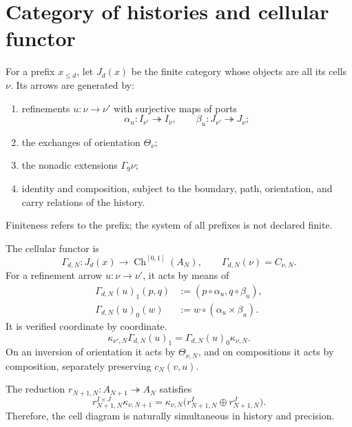 \section{Category of histories and cellular functor}
\label{sec:pdfv2-coh-category}

For a prefix \(x_{\leq d}\), let \(J_d(x)\) be the finite category whose
objects are all its cells \(\nu\). Its arrows are generated by:
\begin{enumerate}
 \item refinements \(u:\nu\to\nu'\) with surjective maps of
       ports
       \[
        \alpha_u:I_{\nu'}\twoheadrightarrow I_\nu,
        \qquad
        \beta_u:J_{\nu'}\twoheadrightarrow J_\nu;
       \]
 \item the exchanges of orientation \(\Theta_\nu\);
 \item the nonadic extensions \(\Gamma_9\nu\);
 \item identity and composition, subject to the boundary,
       path, orientation, and carry relations of the history.
\end{enumerate}
Finiteness refers to the prefix; the system of all prefixes is not declared finite.

The cellular functor is
\begin{equation}\label{eq:pdfv2-coh-gamma-functor}
 \Gamma_{d,N}:J_d(x)\longrightarrow
 \operatorname{Ch}^{[0,1]}(A_N),
 \qquad
 \Gamma_{d,N}(\nu)=C_{\nu,N}.
\end{equation}
For a refinement arrow \(u:\nu\to\nu'\), it acts by means of
\begin{align}
 \Gamma_{d,N}(u)_1(p,q)
 &:=(p\circ\alpha_u,q\circ\beta_u),
 \label{eq:pdfv2-coh-gamma-one}\\
 \Gamma_{d,N}(u)_0(w)
 &:=w\circ(\alpha_u\times\beta_u).
 \label{eq:pdfv2-coh-gamma-zero}
\end{align}
It is verified coordinate by coordinate.
\begin{equation}\label{eq:pdfv2-coh-gamma-chain-map}
 \kappa_{\nu',N}\Gamma_{d,N}(u)_1
 =\Gamma_{d,N}(u)_0\kappa_{\nu,N}.
\end{equation}
On an inversion of orientation it acts by
\(\Theta_{\nu,N}\), and on compositions it acts by composition, separately preserving
\(c_N(v,u)\).

The reduction \(r_{N+1,N}:A_{N+1}\twoheadrightarrow A_N\) satisfies
\begin{equation}\label{eq:pdfv2-coh-kappa-reduction}
 r_{N+1,N}^{I\times J}\kappa_{\nu,N+1}
 =\kappa_{\nu,N}
  \bigl(r_{N+1,N}^{I}\oplus r_{N+1,N}^{J}\bigr).
\end{equation}
Therefore, the cell diagram is naturally simultaneous in history and
precision.

